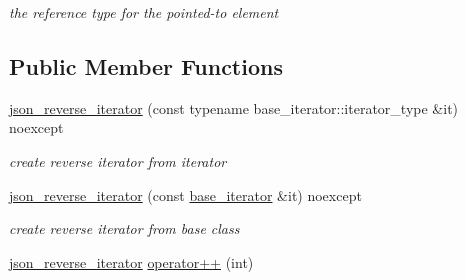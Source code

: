 \begin{DoxyCompactItemize}
\begin{DoxyCompactList}\small\item\em the reference type for the pointed-\/to element \end{DoxyCompactList}\end{DoxyCompactItemize}
\subsection*{Public Member Functions}
\begin{DoxyCompactItemize}
\item 
\hypertarget{classnlohmann_1_1basic__json_1_1json__reverse__iterator_a86c97bbb8ebe19aef4656cf796e30e99_a86c97bbb8ebe19aef4656cf796e30e99}{\hyperlink{classnlohmann_1_1basic__json_1_1json__reverse__iterator_a86c97bbb8ebe19aef4656cf796e30e99_a86c97bbb8ebe19aef4656cf796e30e99}{json\-\_\-reverse\-\_\-iterator} (const typename base\-\_\-iterator\-::iterator\-\_\-type \&it) noexcept}\label{classnlohmann_1_1basic__json_1_1json__reverse__iterator_a86c97bbb8ebe19aef4656cf796e30e99_a86c97bbb8ebe19aef4656cf796e30e99}

\begin{DoxyCompactList}\small\item\em create reverse iterator from iterator \end{DoxyCompactList}\item 
\hypertarget{classnlohmann_1_1basic__json_1_1json__reverse__iterator_a530f042e2ab1c83dddfc344931b0375a_a530f042e2ab1c83dddfc344931b0375a}{\hyperlink{classnlohmann_1_1basic__json_1_1json__reverse__iterator_a530f042e2ab1c83dddfc344931b0375a_a530f042e2ab1c83dddfc344931b0375a}{json\-\_\-reverse\-\_\-iterator} (const \hyperlink{classnlohmann_1_1basic__json_1_1json__reverse__iterator_a9ebc4c99e6fc90c965af0f39ad2ca70e_a9ebc4c99e6fc90c965af0f39ad2ca70e}{base\-\_\-iterator} \&it) noexcept}\label{classnlohmann_1_1basic__json_1_1json__reverse__iterator_a530f042e2ab1c83dddfc344931b0375a_a530f042e2ab1c83dddfc344931b0375a}

\begin{DoxyCompactList}\small\item\em create reverse iterator from base class \end{DoxyCompactList}\item 
\hypertarget{classnlohmann_1_1basic__json_1_1json__reverse__iterator_a545a8204cfd6836eb85abc3113a0bb28_a545a8204cfd6836eb85abc3113a0bb28}{\hyperlink{classnlohmann_1_1basic__json_1_1json__reverse__iterator}{json\-\_\-reverse\-\_\-iterator} \hyperlink{classnlohmann_1_1basic__json_1_1json__reverse__iterator_a545a8204cfd6836eb85abc3113a0bb28_a545a8204cfd6836eb85abc3113a0bb28}{operator++} (int)}\label{classnlohmann_1_1basic__json_1_1json__reverse__iterator_a545a8204cfd6836eb85abc3113a0bb28_a545a8204cfd6836eb85abc3113a0bb28}


\end{DoxyCompactItemize}
